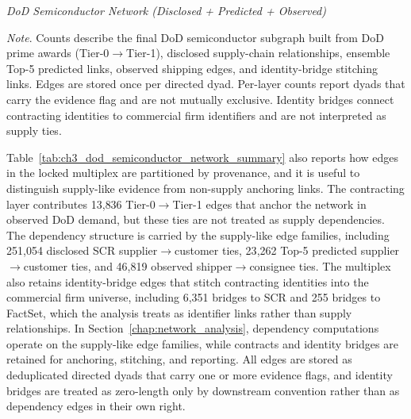 \begin{table}[tbp]
  \centering
  \caption[\textit{DoD semiconductor network summary}]
          {\textit{DoD Semiconductor Network (Disclosed + Predicted + Observed)}}
  \label{tab:ch3_dod_semiconductor_network_summary}

  \begin{adjustbox}{max width=\linewidth}
    
  \end{adjustbox}

  \captionsetup{justification=raggedright,singlelinecheck=false}
  \caption*{\footnotesize \textit{Note}. Counts describe the final DoD semiconductor subgraph built from DoD prime awards (Tier-0$\rightarrow$Tier-1), disclosed supply-chain relationships, ensemble Top-5 predicted links, observed shipping edges, and identity-bridge stitching links. Edges are stored once per directed dyad. Per-layer counts report dyads that carry the evidence flag and are not mutually exclusive. Identity bridges connect contracting identities to commercial firm identifiers and are not interpreted as supply ties.}
\end{table}

Table~\ref{tab:ch3_dod_semiconductor_network_summary} also reports how edges in the locked multiplex are partitioned by provenance, and it is useful to distinguish supply-like evidence from non-supply anchoring links. The contracting layer contributes 13{,}836 Tier-0$\rightarrow$Tier-1 edges that anchor the network in observed DoD demand, but these ties are not treated as supply dependencies. The dependency structure is carried by the supply-like edge families, including 251{,}054 disclosed SCR supplier$\rightarrow$customer ties, 23{,}262 Top-5 predicted supplier$\rightarrow$customer ties, and 46{,}819 observed shipper$\rightarrow$consignee ties. The multiplex also retains identity-bridge edges that stitch contracting identities into the commercial firm universe, including 6{,}351 bridges to SCR and 255 bridges to FactSet, which the analysis treats as identifier links rather than supply relationships. In Section~\ref{chap:network_analysis}, dependency computations operate on the supply-like edge families, while contracts and identity bridges are retained for anchoring, stitching, and reporting. All edges are stored as deduplicated directed dyads that carry one or more evidence flags, and identity bridges are treated as zero-length only by downstream convention rather than as dependency edges in their own right.

